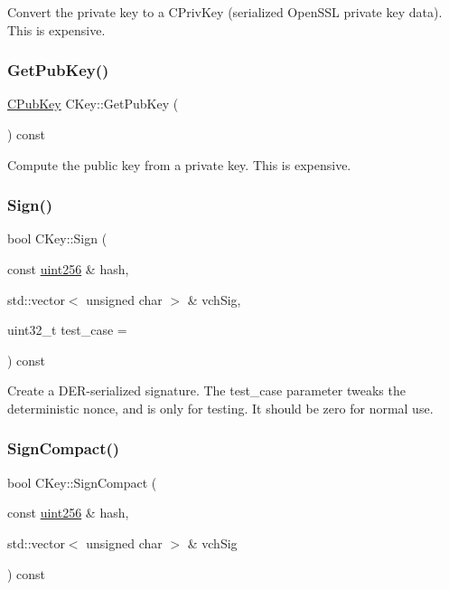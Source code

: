 Convert the private key to a C\+Priv\+Key (serialized Open\+S\+SL private key data). This is expensive. \mbox{\label{class_c_key_aa1085c59603a62db6ec776300f250337}} 
\subsubsection{\texorpdfstring{GetPubKey()}{GetPubKey()}}
{\footnotesize\ttfamily \mbox{\hyperlink{class_c_pub_key}{C\+Pub\+Key}} C\+Key\+::\+Get\+Pub\+Key (\begin{DoxyParamCaption}{ }\end{DoxyParamCaption}) const}

Compute the public key from a private key. This is expensive. \mbox{\label{class_c_key_aa9b184a4a71d3e1a40aab360cf68e86c}} 
\subsubsection{\texorpdfstring{Sign()}{Sign()}}
{\footnotesize\ttfamily bool C\+Key\+::\+Sign (\begin{DoxyParamCaption}\item[{const \mbox{\hyperlink{classuint256}{uint256}} \&}]{hash,  }\item[{std\+::vector$<$ unsigned char $>$ \&}]{vch\+Sig,  }\item[{uint32\+\_\+t}]{test\+\_\+case = {} }\end{DoxyParamCaption}) const}

Create a D\+E\+R-\/serialized signature. The test\+\_\+case parameter tweaks the deterministic nonce, and is only for testing. It should be zero for normal use. \mbox{\label{class_c_key_afe77d80889aa68e92e6882e75424cfb8}} 
\subsubsection{\texorpdfstring{SignCompact()}{SignCompact()}}
{\footnotesize\ttfamily bool C\+Key\+::\+Sign\+Compact (\begin{DoxyParamCaption}\item[{const \mbox{\hyperlink{classuint256}{uint256}} \&}]{hash,  }\item[{std\+::vector$<$ unsigned char $>$ \&}]{vch\+Sig }\end{DoxyParamCaption}) const}

